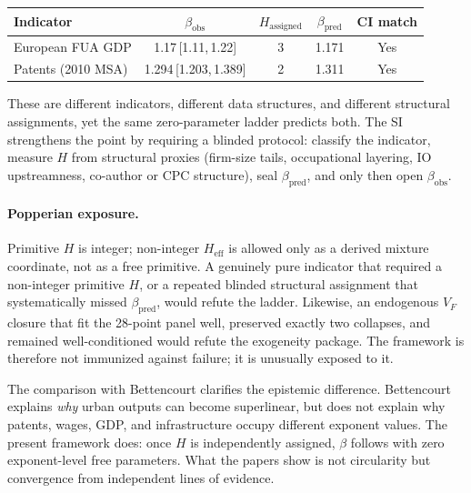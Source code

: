 \documentclass[11pt]{article}
\begin{document}
\begin{center}
\small
\begin{tabular}{lcccc}
\toprule
Indicator & $\beta_{\mathrm{obs}}$ & $H_{\mathrm{assigned}}$ & $\beta_{\mathrm{pred}}$ & CI match \\
\midrule
European FUA GDP & 1.17\,[1.11,\,1.22] & 3 & 1.171 & Yes \\
Patents (2010 MSA) & 1.294\,[1.203,\,1.389] & 2 & 1.311 & Yes \\
\bottomrule
\end{tabular}
\end{center}

\noindent These are different indicators, different data structures, and different structural assignments, yet the same zero-parameter ladder predicts both.
The SI strengthens the point by requiring a blinded protocol: classify the indicator, measure $H$ from structural proxies (firm-size tails, occupational layering, IO upstreamness, co-author or CPC structure), seal $\beta_{\mathrm{pred}}$, and only then open $\beta_{\mathrm{obs}}$.

\paragraph{Popperian exposure.}
Primitive $H$ is integer; non-integer $H_{\mathrm{eff}}$ is allowed only as a derived mixture coordinate, not as a free primitive.
A genuinely pure indicator that required a non-integer primitive $H$, or a repeated blinded structural assignment that systematically missed $\beta_{\mathrm{pred}}$, would refute the ladder.
Likewise, an endogenous $V_F$ closure that fit the 28-point panel well, preserved exactly two collapses, and remained well-conditioned would refute the exogeneity package.
The framework is therefore not immunized against failure; it is unusually exposed to it.

The comparison with Bettencourt clarifies the epistemic difference.
Bettencourt explains \emph{why} urban outputs can become superlinear, but does not explain why patents, wages, GDP, and infrastructure occupy different exponent values.
The present framework does: once $H$ is independently assigned, $\beta$ follows with zero exponent-level free parameters.
What the papers show is not circularity but convergence from independent lines of evidence.



\end{document}
